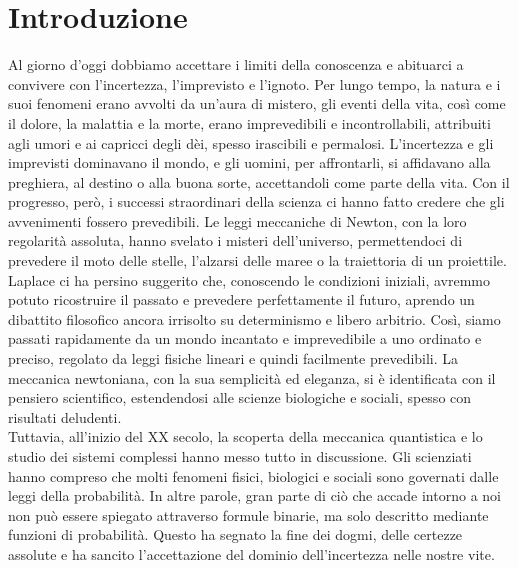 \chapter{Introduzione}
\label{cap:introduzione}




Al giorno d'oggi dobbiamo accettare i limiti della conoscenza e abituarci a convivere con l'incertezza, l'imprevisto e l'ignoto. Per lungo tempo, la natura e i suoi fenomeni erano avvolti da un'aura di mistero, gli eventi della vita, così come il dolore, la malattia e la morte, erano imprevedibili e incontrollabili, attribuiti agli umori e ai capricci degli dèi, spesso irascibili e permalosi. L'incertezza e gli imprevisti dominavano il mondo, e gli uomini, per affrontarli, si affidavano alla preghiera, al destino o alla buona sorte, accettandoli come parte della vita. Con il progresso, però, i successi straordinari della scienza ci hanno fatto credere che gli avvenimenti fossero prevedibili. Le leggi meccaniche di Newton, con la loro regolarità assoluta, hanno svelato i misteri dell'universo, permettendoci di prevedere il moto delle stelle, l'alzarsi delle maree o la traiettoria di un proiettile. Laplace ci ha persino suggerito che, conoscendo le condizioni iniziali, avremmo potuto ricostruire il passato e prevedere perfettamente il futuro, aprendo un dibattito filosofico ancora irrisolto su determinismo e libero arbitrio. Così, siamo passati rapidamente da un mondo incantato e imprevedibile a uno ordinato e preciso, regolato da leggi fisiche lineari e quindi facilmente prevedibili. La meccanica newtoniana, con la sua semplicità ed eleganza, si è identificata con il pensiero scientifico, estendendosi alle scienze biologiche e sociali, spesso con risultati deludenti.\\ 

Tuttavia, all'inizio del XX secolo, la scoperta della meccanica quantistica e lo studio dei sistemi complessi hanno messo tutto in discussione. Gli scienziati hanno compreso che molti fenomeni fisici, biologici e sociali sono governati dalle leggi della probabilità. In altre parole, gran parte di ciò che accade intorno a noi non può essere spiegato attraverso formule binarie, ma solo descritto mediante funzioni di probabilità. Questo ha segnato la fine dei dogmi, delle certezze assolute e ha sancito l'accettazione del dominio dell'incertezza nelle nostre vite.\\

